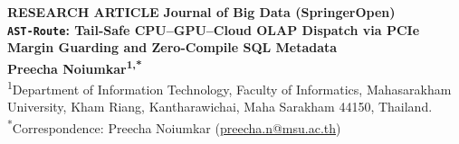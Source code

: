 \documentclass[10pt,a4paper]{article}
\begin{document}
\linenumbers
\expandafter\def\expandafter\UrlBreaks\expandafter{\UrlBreaks\do\-\do\_\do\/\do\.\do\0\do\1\do\2\do\3\do\4\do\5\do\6\do\7\do\8\do\9\do\a\do\b\do\c\do\d\do\e\do\f}

{\footnotesize\sffamily\color{springerblue}\textbf{RESEARCH ARTICLE} \hfill \textbf{Journal of Big Data (SpringerOpen)}}\\[0.8em]

{\LARGE\sffamily\bfseries \texttt{AST-Route}: Tail-Safe CPU--GPU--Cloud OLAP Dispatch via PCIe Margin Guarding and Zero-Compile SQL Metadata}\\[0.9em]

{\large\textbf{Preecha Noiumkar\textsuperscript{1,*}}}\\[4pt]
\textsuperscript{1}Department of Information Technology, Faculty of Informatics, Mahasarakham University, Kham Riang, \mbox{Kantharawichai}, Maha Sarakham 44150, Thailand.\\
\textsuperscript{*}Correspondence: Preecha Noiumkar (\href{mailto:preecha.n@msu.ac.th}{preecha.n@msu.ac.th})\\[0.8em]
\end{document}
